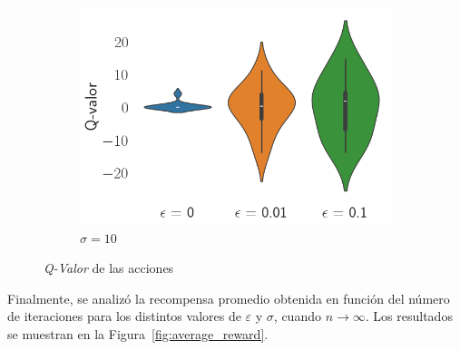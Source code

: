 \documentclass[12pt]{article}
\begin{document}
\begin{figure}[H]
\begin{subfigure}[H]{0.3\textwidth}
            \includegraphics[width=\textwidth]{../img/2000/values_sigma_10}
            \caption{$\sigma=10$}
            \label{fig:estimations_2}
        \end{subfigure}

        \caption{\textit{Q-Valor} de las acciones}
        \label{fig:estimations}
    \end{figure}

    Finalmente, se analizó la recompensa promedio obtenida en función del número de iteraciones para los distintos valores de $\varepsilon$ y $\sigma$, cuando $n \rightarrow \infty$.
    Los resultados se muestran en la Figura~\ref{fig:average_reward}.
\end{document}
